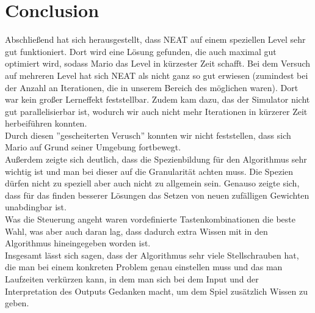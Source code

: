 \documentclass{hbrs-ecta-report}
\begin{document}
\FloatBarrier
\newpage
\section{Conclusion}
Abschließend hat sich herausgestellt, dass NEAT auf einem speziellen Level sehr gut funktioniert. Dort wird eine Lösung gefunden, die auch maximal gut optimiert wird, sodass Mario das Level in kürzester Zeit schafft. Bei dem Versuch auf mehreren Level hat sich NEAT als nicht ganz so gut erwiesen (zumindest bei der Anzahl an Iterationen, die in unserem Bereich des möglichen waren). Dort war kein großer Lerneffekt feststellbar. Zudem kam dazu, das der Simulator nicht gut parallelisierbar ist, wodurch wir auch nicht mehr Iterationen in kürzerer Zeit herbeiführen konnten. \\
Durch diesen ''gescheiterten Verusch'' konnten wir nicht feststellen, dass sich Mario auf Grund seiner Umgebung fortbewegt.\\

Außerdem zeigte sich deutlich, dass die Spezienbildung für den Algorithmus sehr wichtig ist und man bei dieser auf die Granularität achten muss. Die Spezien dürfen nicht zu speziell aber auch nicht zu allgemein sein.
Genauso zeigte sich, dass für das finden besserer Lösungen das Setzen von neuen zufälligen Gewichten unabdingbar ist.\\

Was die Steuerung angeht waren vordefinierte Tastenkombinationen die beste Wahl, was aber auch daran lag, dass dadurch extra Wissen mit in den Algorithmus hineingegeben worden ist.\\

Insgesamt lässt sich sagen, dass der Algorithmus sehr viele Stellschrauben hat, die man bei einem konkreten Problem genau einstellen muss und das man Laufzeiten verkürzen kann, in dem man sich bei dem Input und der Interpretation des Outputs Gedanken macht, um dem Spiel zusätzlich Wissen zu geben.


 
\end{document}
